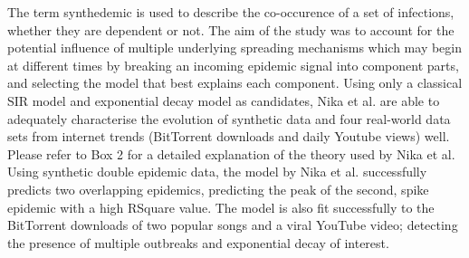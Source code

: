 \documentclass[11pt, a4paper, oneside,titlepage]{article}
\begin{document}
The term synthedemic is used to describe the co-occurence of a set of
infections, whether they are dependent or not. The aim of the study
was to account for the potential influence of multiple underlying
spreading mechanisms which may begin at different times by breaking an
incoming epidemic signal into component parts, and selecting the model
that best explains each component. Using only a classical SIR model
and exponential decay model as candidates, Nika et al. are able to
adequately characterise the evolution of synthetic data and four
real-world data sets from internet trends (BitTorrent downloads and
daily Youtube views) well. Please refer to Box 2 for a detailed
explanation of the theory used by Nika et al. Using synthetic double
epidemic data, the model by Nika et al. successfully predicts two
overlapping epidemics, predicting the peak of the second, spike
epidemic with a high RSquare value. The model is also fit successfully
to the BitTorrent downloads of two popular songs and a viral YouTube
video; detecting the presence of multiple outbreaks and exponential
decay of interest.
\newpage
\end{document}
